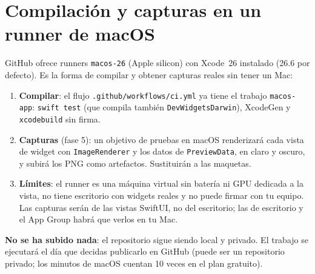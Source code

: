 \documentclass[11pt,a4paper]{article}
\begin{document}
\section{Compilación y capturas en un runner de macOS}\label{sec:runner}
GitHub ofrece runners \texttt{macos-26} (Apple silicon) con Xcode~26
instalado (26.6 por defecto). Es la forma de compilar y obtener
capturas reales sin tener un Mac:
\begin{enumerate}
  \item \textbf{Compilar}: el flujo \texttt{.github/workflows/ci.yml}
    ya tiene el trabajo \texttt{macos-app}: \texttt{swift test} (que
    compila también \texttt{DevWidgetsDarwin}), XcodeGen y
    \texttt{xcodebuild} sin firma.
  \item \textbf{Capturas} (fase 5): un objetivo de pruebas en macOS
    renderizará cada vista de widget con \texttt{ImageRenderer} y los
    datos de \texttt{PreviewData}, en claro y oscuro, y subirá los PNG
    como artefactos. Sustituirán a las maquetas.
  \item \textbf{Límites}: el runner es una máquina virtual sin
    batería ni GPU dedicada a la vista, no tiene escritorio con
    widgets reales y no puede firmar con tu equipo. Las capturas serán
    de las vistas SwiftUI, no del escritorio; las de escritorio y el
    App Group habrá que verlos en tu Mac.
\end{enumerate}
\textbf{No se ha subido nada}: el repositorio sigue siendo local y
privado. El trabajo se ejecutará el día que decidas publicarlo en
GitHub (puede ser un repositorio privado; los minutos de macOS cuentan
10 veces en el plan gratuito).
\end{document}
